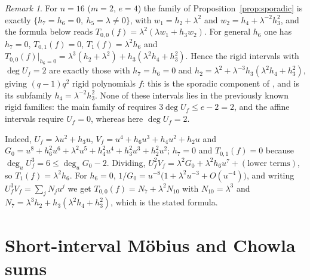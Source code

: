 \documentclass[11pt,a4paper]{amsart}
\theoremstyle{remark}
\newtheorem{remark}[theorem]{Remark}
\numberwithin{equation}{section}
\begin{document}
\begin{remark}\label{rem:n16}
For $n=16$ ($m=2$, $e=4$) the family of Proposition~\ref{prop:sporadic} is exactly $\{h_7=h_6=0,\ h_5=\lambda\ne0\}$,
with $w_1=h_2+\lambda^2$ and $w_2=h_4+\lambda^{-2}h_3^2$, and the formula below reads
$T_{0,0}(f)=\lambda^2(\lambda w_1+h_3w_2)$. For general $h_6$ one has $h_7=0$,
$T_{0,1}(f)=0$, $T_1(f)=\lambda^2h_6$ and
$T_{0,0}(f)|_{h_6=0}=\lambda^3(h_2+\lambda^2)+h_3(\lambda^2h_4+h_3^2)$. Hence the rigid intervals with $\deg U_f=2$
are exactly those with $h_7=h_6=0$ and $h_2=\lambda^2+\lambda^{-3}h_3(\lambda^2h_4+h_3^2)$, giving $(q-1)q^2$ rigid
polynomials $f$: this is the sporadic component of \cite[Table~1]{ChenShort}, and \cite[Proposition~3.3]{ChenShort}
is its subfamily $h_4=\lambda^{-2}h_3^2$. None of these intervals lies in the previously known rigid families:
the main family of \cite[Theorem~3.2(c)]{ChenShort} requires $3\deg U_f\le e-2=2$, and the affine intervals
require $U_f=0$, whereas here $\deg U_f=2$.

Indeed, $U_f=\lambda u^2+h_3u$, $V_f=u^4+h_6u^3+h_4u^2+h_2u$ and
$G_0=u^8+h_6^2u^6+\lambda^2u^5+h_4^2u^4+h_3^2u^3+h_2^2u^2$; $h_7=0$ and $T_{0,1}(f)=0$ because
$\deg_u U_f^3=6\le\deg_uG_0-2$. Dividing, $U_f^2V_f=\lambda^2G_0+\lambda^2h_6u^7+(\text{lower terms})$, so
$T_1(f)=\lambda^2h_6$. For $h_6=0$, $1/G_0=u^{-8}\bigl(1+\lambda^2u^{-3}+O(u^{-4})\bigr)$, and writing
$U_f^3V_f=\sum_jN_ju^j$ we get $T_{0,0}(f)=N_7+\lambda^2N_{10}$ with $N_{10}=\lambda^3$ and
$N_7=\lambda^3h_2+h_3(\lambda^2h_4+h_3^2)$, which is the stated formula.
\end{remark}

\section{Short-interval M\"obius and Chowla sums}\label{sec:mobius-chowla}
\end{document}
